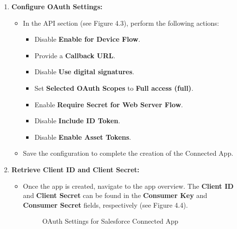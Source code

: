 \begin{enumerate}
    \item \textbf{Configure OAuth Settings:}
    \begin{itemize}
        \item In the API section (see Figure 4.3), perform the following actions:
        \begin{itemize}
            \item Disable \textbf{Enable for Device Flow}.
            \item Provide a \textbf{Callback URL}.
            \item Disable \textbf{Use digital signatures}.
            \item Set \textbf{Selected OAuth Scopes} to \textbf{Full access (full)}.
            \item Enable \textbf{Require Secret for Web Server Flow}.
            \item Disable \textbf{Include ID Token}.
            \item Disable \textbf{Enable Asset Tokens}.
        \end{itemize}
        \item Save the configuration to complete the creation of the Connected App.

    \end{itemize}

    \item \textbf{Retrieve Client ID and Client Secret:}
    \begin{itemize}
        \item Once the app is created, navigate to the app overview. The \textbf{Client ID} and \textbf{Client Secret} can be found in the \textbf{Consumer Key} and \textbf{Consumer Secret} fields, respectively (see Figure 4.4).

    \begin{figure}[H]
    \centering
    \caption{OAuth Settings for Salesforce Connected App}
    
    \end{figure}

    \end{itemize}
\end{enumerate}


